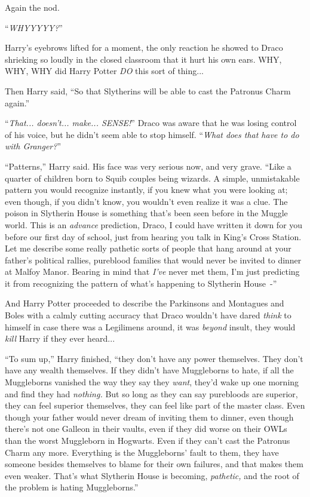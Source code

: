 Again the nod.

``\emph{WHYYYYY?}''

Harry's eyebrows lifted for a moment, the only reaction he showed to Draco shrieking so loudly in the closed classroom that it hurt his own ears. WHY, WHY, WHY did Harry Potter \emph{DO} this sort of thing...

Then Harry said, ``So that Slytherins will be able to cast the Patronus Charm again.''

``\emph{That... doesn't... make... SENSE!}'' Draco was aware that he was losing control of his voice, but he didn't seem able to stop himself. ``\emph{What does that have to do with Granger?}''

``Patterns,'' Harry said. His face was very serious now, and very grave. ``Like a quarter of children born to Squib couples being wizards. A simple, unmistakable pattern you would recognize instantly, if you knew what you were looking at; even though, if you didn't know, you wouldn't even realize it was a clue. The poison in Slytherin House is something that's been seen before in the Muggle world. This is an \emph{advance} prediction, Draco, I could have written it down for you before our first day of school, just from hearing you talk in King's Cross Station. Let me describe some really pathetic sorts of people that hang around at your father's political rallies, pureblood families that would never be invited to dinner at Malfoy Manor. Bearing in mind that \emph{I've} never met them, I'm just predicting it from recognizing the pattern of what's happening to Slytherin House~-''

And Harry Potter proceeded to describe the Parkinsons and Montagues and Boles with a calmly cutting accuracy that Draco wouldn't have dared \emph{think} to himself in case there was a Legilimens around, it was \emph{beyond} insult, they would \emph{kill} Harry if they ever heard...

``To sum up,'' Harry finished, ``they don't have any power themselves. They don't have any wealth themselves. If they didn't have Muggleborns to hate, if all the Muggleborns vanished the way they say they \emph{want}, they'd wake up one morning and find they had \emph{nothing.} But so long as they can say purebloods are superior, they can feel superior themselves, they can feel like part of the master class. Even though your father would never dream of inviting them to dinner, even though there's not one Galleon in their vaults, even if they did worse on their OWLs than the worst Muggleborn in Hogwarts. Even if they can't cast the Patronus Charm any more. Everything is the Muggleborns' fault to them, they have someone besides themselves to blame for their own failures, and that makes them even weaker. That's what Slytherin House is becoming, \emph{pathetic,} and the root of the problem is hating Muggleborns.''

